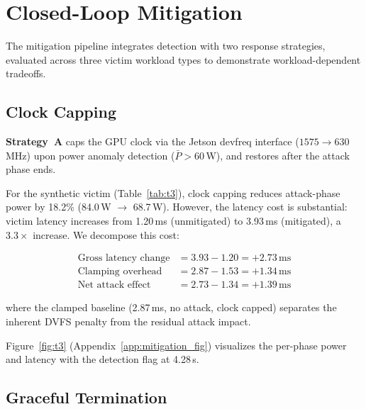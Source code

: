\documentclass[letterpaper,twocolumn,10pt]{article}
\begin{document}
\section{Closed-Loop Mitigation}
\label{sec:mitigation}

The mitigation pipeline integrates detection with two response
strategies, evaluated across three victim workload types to
demonstrate workload-dependent tradeoffs.

\subsection{Clock Capping}
\label{sec:mit-clock}

\textbf{Strategy~A} caps the GPU clock via the Jetson devfreq
interface ($1575 \to 630$\,MHz) upon power anomaly detection
($\bar{P} > 60$\,W), and restores after the attack phase ends.

For the synthetic victim (Table~\ref{tab:t3}), clock capping
reduces attack-phase power by 18.2\% (84.0\,W $\to$ 68.7\,W).
However, the latency cost is substantial: victim latency increases
from 1.20\,ms (unmitigated) to 3.93\,ms (mitigated), a
$3.3\times$ increase.  We decompose this cost:

\begin{align}
\text{Gross latency change} &= 3.93 - 1.20 = +2.73\,\text{ms} \\
\text{Clamping overhead} &= 2.87 - 1.53 = +1.34\,\text{ms} \\
\text{Net attack effect} &= 2.73 - 1.34 = +1.39\,\text{ms}
\end{align}

where the clamped baseline (2.87\,ms, no attack, clock capped)
separates the inherent DVFS penalty from the residual attack impact.

\begin{table}[t]
\centering
\caption{Closed-loop mitigation: synthetic victim (5 trials,
  15\,s/phase). Clock cap: $1575 \to 630$\,MHz via devfreq.}
\label{tab:t3}
\resizebox{\columnwidth}{!}{}
\end{table}

Figure~\ref{fig:t3} (Appendix~\ref{app:mitigation_fig})
visualizes the per-phase power and latency with the detection
flag at 4.28\,s.

\subsection{Graceful Termination}
\label{sec:mit-kill}
\end{document}
